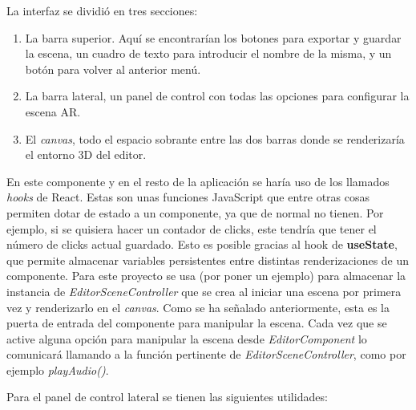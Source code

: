 La interfaz se dividió en tres secciones:

\begin{enumerate}
    \item La barra superior. Aquí se encontrarían los botones para exportar y guardar la escena, un cuadro de texto para introducir el nombre de la misma, y un botón para volver al anterior menú.
    \item La barra lateral, un panel de control con todas las opciones para configurar la escena AR.
    \item El \textit{canvas}, todo el espacio sobrante entre las dos barras donde se renderizaría el entorno 3D del editor.
\end{enumerate}

En este componente y en el resto de la aplicación se haría uso de los llamados \textit{hooks} de React. Estas son unas funciones JavaScript que entre otras cosas permiten dotar de estado a un componente, ya que de normal no tienen. Por ejemplo, si se quisiera hacer un contador de clicks, este tendría que tener el número de clicks actual guardado. Esto es posible gracias al hook de \textbf{useState}, que permite almacenar variables persistentes entre distintas renderizaciones de un componente. Para este proyecto se usa (por poner un ejemplo) para almacenar la instancia de \textit{EditorSceneController} que se crea al iniciar una escena por primera vez y renderizarlo en el \textit{canvas}. Como se ha señalado anteriormente, esta es la puerta de entrada del componente para manipular la escena. Cada vez que se active alguna opción para manipular la escena desde \textit{EditorComponent} lo comunicará llamando a la función pertinente de \textit{EditorSceneController}, como por ejemplo \textit{playAudio()}.

Para el panel de control lateral se tienen las siguientes utilidades:

